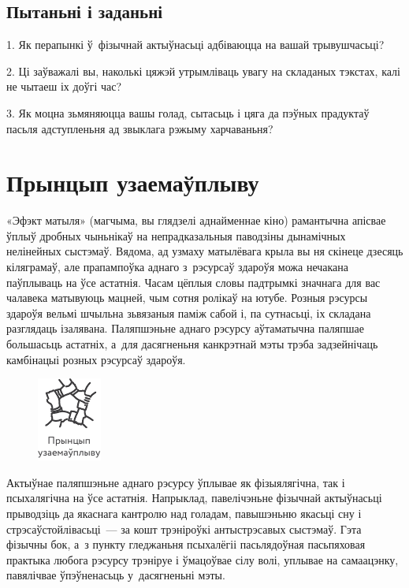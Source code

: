 \subsection*{Пытаньні і заданьні}

1. Як перапынкі ў~фізычнай актыўнасьці адбіваюцца на вашай трывушчасьці?

2. Ці заўважалі вы, наколькі цяжэй утрымліваць увагу на складаных тэкстах, калі не чытаеш іх доўгі час?

3. Як моцна зьмяняюцца вашы голад, сытасьць і цяга да пэўных прадуктаў пасьля адступленьня ад звыклага рэжыму харчаваньня?


\section{Прынцып узаемаўплыву}

«Эфэкт матыля» (магчыма, вы глядзелі аднайменнае кіно) рамантычна апісвае ўплыў дробных чыньнікаў на непрадказальныя паводзіны дынамічных нелінейных сыстэмаў. Вядома, ад узмаху матылёвага крыла вы ня скінеце дзесяць кіляграмаў, але прапампоўка аднаго з~рэсурсаў здароўя можа нечакана паўплываць на ўсе астатнія. Часам цёплыя словы падтрымкі значнага для вас чалавека матывуюць мацней, чым сотня ролікаў на ютубе. Розныя рэсурсы здароўя вельмі шчыльна зьвязаныя паміж сабой і, па сутнасьці, іх складана разглядаць ізалявана. Паляпшэньне аднаго рэсурсу аўтаматычна паляпшае большасьць астатніх, а~для дасягненьня канкрэтнай мэты трэба задзейнічаць камбінацыі розных рэсурсаў здароўя.

\begin{figure}[htb!]
  \centering
  \includegraphics[scale=1.5]{willpower/ch3/15.pdf}
\end{figure}

Актыўнае паляпшэньне аднаго рэсурсу ўплывае як фізыялягічна, так і псыхалягічна на ўсе астатнія. Напрыклад, павелічэньне фізычнай актыўнасьці прыводзіць да якаснага кантролю над голадам, павышэньню якасьці сну і стрэсаўстойлівасьці~--- за кошт трэніроўкі антыстрэсавых сыстэмаў. Гэта фізычны бок, а~з пункту гледжаньня псыхалёгіі пасьлядоўная пасьпяховая практыка любога рэсурсу трэніруе і ўмацоўвае сілу волі, уплывае на самаацэнку, павялічвае ўпэўненасьць у~дасягненьні мэты.

